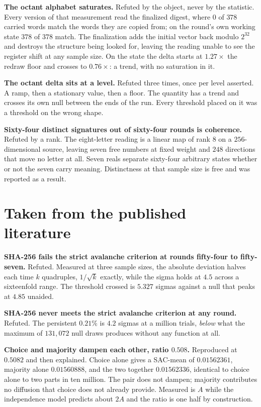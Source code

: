 \textbf{The octant alphabet saturates.} Refuted by the object, never by the statistic. Every version of that measurement read the finalized digest, where \(0\) of \(378\) carried words match the words they are copied from; on the round's own working state \(378\) of \(378\) match. The finalization adds the initial vector back modulo \(2^{32}\) and destroys the structure being looked for, leaving the reading unable to see the register shift at any sample size. On the state the delta starts at \(1.27\times\) the redraw floor and crosses to \(0.76\times\): a trend, with no saturation in it.

\textbf{The octant delta sits at a level.} Refuted three times, once per level asserted. A ramp, then a stationary value, then a floor. The quantity has a trend and crosses its own null between the ends of the run. Every threshold placed on it was a threshold on the wrong shape.

\textbf{Sixty-four distinct signatures out of sixty-four rounds is coherence.} Refuted by a rank. The eight-letter reading is a linear map of rank \(8\) on a \(256\)-dimensional source, leaving seven free numbers at fixed weight and \(248\) directions that move no letter at all. Seven reals separate sixty-four arbitrary states whether or not the seven carry meaning. Distinctness at that sample size is free and was reported as a result.

\section{Taken from the published literature}

\textbf{SHA-256 fails the strict avalanche criterion at rounds fifty-four to fifty-seven.} Refuted. Measured at three sample sizes, the absolute deviation halves each time \(k\) quadruples, \(1/\sqrt{k}\) exactly, while the sigma holds at \(4.5\) across a sixteenfold range. The threshold crossed is \(5.327\) sigmas against a null that peaks at \(4.85\) unaided.

\textbf{SHA-256 never meets the strict avalanche criterion at any round.} Refuted. The persistent \(0.21\%\) is \(4.2\) sigmas at a million trials, \emph{below} what the maximum of \(131{,}072\) null draws produces without any function at all.

\textbf{Choice and majority dampen each other, ratio \(0.508\).} Reproduced at \(0.5082\) and then explained. Choice alone gives a SAC-mean of \(0.01562361\), majority alone \(0.01560888\), and the two together \(0.01562336\), identical to choice alone to two parts in ten million. The pair does not dampen; majority contributes no diffusion that choice does not already provide. Measured is \(A\) while the independence model predicts about \(2A\) and the ratio is one half by construction.

